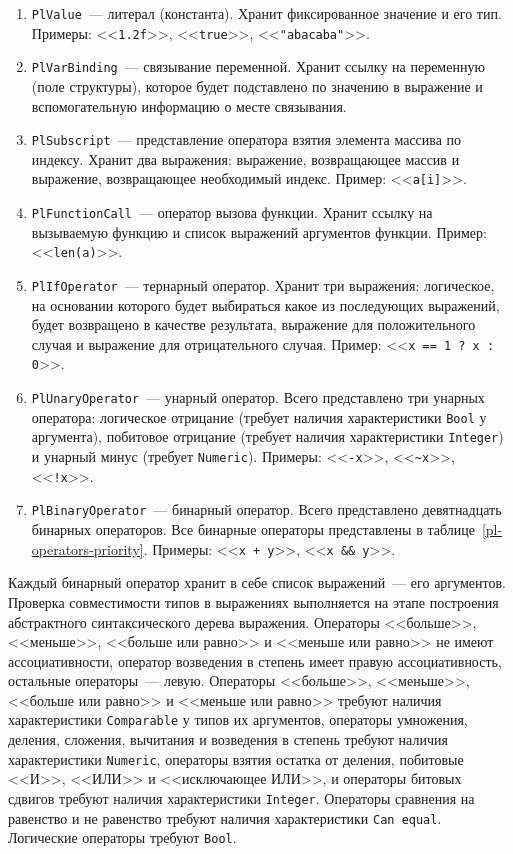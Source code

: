 \documentclass[times,specification,annotation]{style/itmo-student-thesis/itmo-student-thesis}
\begin{document}
\begin{enumerate}[leftmargin=1.75cm]
    \item \texttt{PlValue}~--- литерал (константа). Хранит фиксированное значение и его тип. Примеры: <<\texttt{1.2f}>>, <<\texttt{true}>>, <<\texttt{"abacaba"}>>.
    \item \texttt{PlVarBinding}~--- связывание переменной. Хранит ссылку на переменную (поле структуры), которое будет подставлено по значению в выражение и вспомогательную информацию о месте связывания.
    \item \texttt{PlSubscript}~--- представление оператора взятия элемента массива по индексу. Хранит два выражения: выражение, возвращающее массив и выражение, возвращающее необходимый индекс. Пример: <<\texttt{a[i]}>>.
    \item \texttt{PlFunctionCall}~--- оператор вызова функции. Хранит ссылку на вызываемую функцию и список выражений аргументов функции. Пример: <<\texttt{len(a)}>>.
    \item \texttt{PlIfOperator}~--- тернарный оператор. Хранит три выражения: логическое, на основании которого будет выбираться какое из последующих выражений, будет возвращено в качестве результата, выражение для положительного случая и выражение для отрицательного случая. Пример: <<\texttt{x == 1 ? x : 0}>>.
    \item \texttt{PlUnaryOperator}~--- унарный оператор. Всего представлено три унарных оператора: логическое отрицание (требует наличия характеристики \texttt{Bool} у аргумента), побитовое отрицание (требует наличия характеристики \texttt{Integer}) и унарный минус (требует \texttt{Numeric}). Примеры: <<\texttt{-x}>>, <<\texttt{\textasciitilde{x}}>>, <<\texttt{!x}>>.
    \item \texttt{PlBinaryOperator}~--- бинарный оператор. Всего представлено девятнадцать бинарных операторов. Все бинарные операторы представлены в таблице~\ref{pl-operators-priority}. Примеры: <<\texttt{x + y}>>, <<\texttt{x \&\& y}>>.
\end{enumerate}

Каждый бинарный оператор хранит в себе список выражений~--- его аргументов. Проверка совместимости типов в выражениях выполняется на этапе построения абстрактного синтаксического дерева выражения. Операторы <<больше>>, <<меньше>>, <<больше или равно>> и <<меньше или равно>> не имеют ассоциативности, оператор возведения в степень имеет правую ассоциативность, остальные операторы~--- левую. Операторы <<больше>>, <<меньше>>, <<больше или равно>> и <<меньше или равно>> требуют наличия характеристики \texttt{Comparable} у типов их аргументов, операторы умножения, деления, сложения, вычитания и возведения в степень требуют наличия характеристики \texttt{Numeric}, операторы взятия остатка от деления, побитовые <<И>>, <<ИЛИ>> и <<исключающее ИЛИ>>, и операторы битовых сдвигов требуют наличия характеристики \texttt{Integer}. Операторы сравнения на равенство и не равенство требуют наличия характеристики \texttt{Can equal}. Логические операторы требуют \texttt{Bool}.
\end{document}
